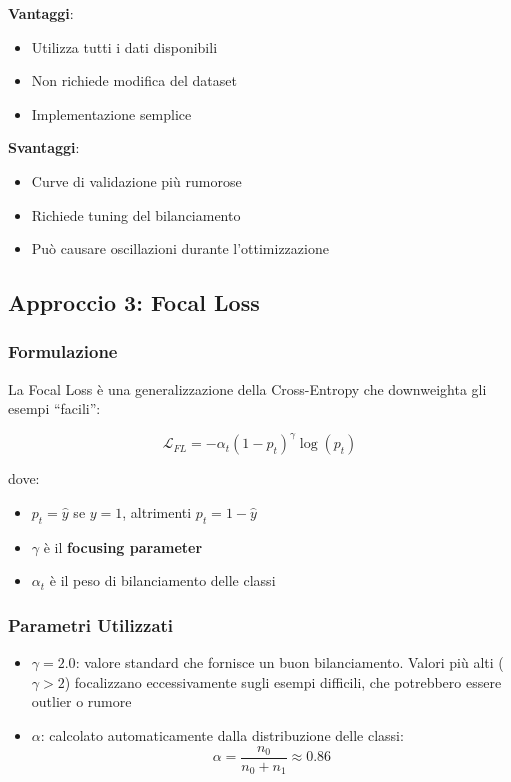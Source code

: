 \textbf{Vantaggi}:
\begin{itemize}
    \item Utilizza tutti i dati disponibili
    \item Non richiede modifica del dataset
    \item Implementazione semplice
\end{itemize}

\textbf{Svantaggi}:
\begin{itemize}
    \item Curve di validazione più rumorose
    \item Richiede tuning del bilanciamento
    \item Può causare oscillazioni durante l'ottimizzazione
\end{itemize}

\subsection{Approccio 3: Focal Loss}

\subsubsection{Formulazione}

La Focal Loss è una generalizzazione della Cross-Entropy che downweighta gli esempi ``facili'':

\begin{equation}
    \mathcal{L}_{FL} = -\alpha_t (1 - p_t)^\gamma \log(p_t)
\end{equation}

dove:
\begin{itemize}
    \item $p_t = \hat{y}$ se $y = 1$, altrimenti $p_t = 1 - \hat{y}$
    \item $\gamma$ è il \textbf{focusing parameter}
    \item $\alpha_t$ è il peso di bilanciamento delle classi
\end{itemize}

\subsubsection{Parametri Utilizzati}

\begin{itemize}
    \item \textbf{$\gamma = 2.0$}: valore standard che fornisce un buon bilanciamento. Valori più alti ($\gamma > 2$) focalizzano eccessivamente sugli esempi difficili, che potrebbero essere outlier o rumore
    \item \textbf{$\alpha$}: calcolato automaticamente dalla distribuzione delle classi:
    \begin{equation}
        \alpha = \frac{n_0}{n_0 + n_1} \approx 0.86
    \end{equation}
\end{itemize}


